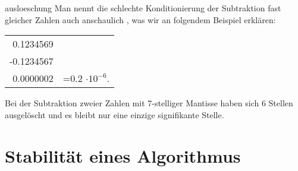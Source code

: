\begin{Bemerkung}{ausloeschung}
  Man nennt die schlechte Konditionierung der Subtraktion fast
  gleicher Zahlen auch anschaulich , was wir an
  folgendem Beispiel erklären:
  \begin{center}
    \begin{tabular}{r@{}l}
      0.1234569&\\
      -0.1234567&\\\hline
      0.0000002&=0.2 $\cdot 10^{-6}$.
    \end{tabular}
  \end{center}
  Bei der Subtraktion zweier Zahlen mit 7-stelliger Mantisse haben
  sich 6 Stellen ausgelöscht und es bleibt nur eine einzige
  signifikante Stelle.
\end{Bemerkung}

\section{Stabilität eines Algorithmus}

